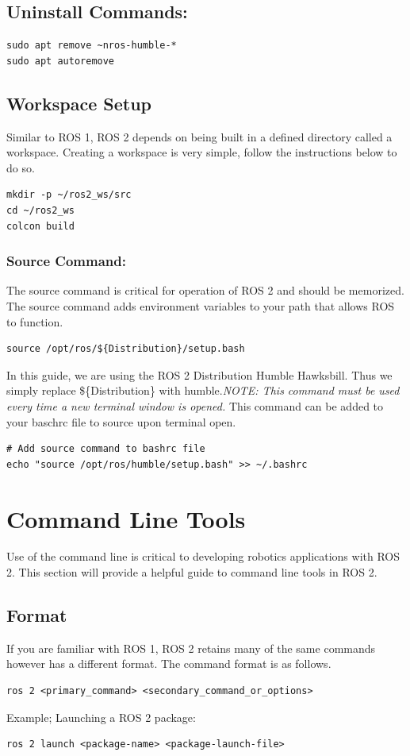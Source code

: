 \documentclass[11pt]{article}
\begin{document}
\subsection{Uninstall Commands: }
\begin{lstlisting}
sudo apt remove ~nros-humble-*
sudo apt autoremove
\end{lstlisting}
\subsection{Workspace Setup}
Similar to ROS 1, ROS 2 depends on being built in a defined directory called a workspace. Creating a workspace is very simple, follow the instructions below to do so.\\
\begin{lstlisting}
mkdir -p ~/ros2_ws/src
cd ~/ros2_ws 
colcon build
\end{lstlisting}

\subsubsection{Source Command: }
The source command is critical for operation of ROS 2 and should be memorized. The source command adds environment variables to your path that allows ROS to function. 

\begin{lstlisting}
source /opt/ros/${Distribution}/setup.bash
\end{lstlisting}
\noindent
In this guide, we are using the ROS 2 Distribution Humble Hawksbill. Thus we simply replace \$\{Distribution\} with humble.\textit{NOTE: This command must be used every time a new terminal window is opened.} This command can be added to your baschrc file to source upon terminal open.\\
\begin{lstlisting}
# Add source command to bashrc file
echo "source /opt/ros/humble/setup.bash" >> ~/.bashrc
\end{lstlisting}




\section{Command Line Tools}
Use of the command line is critical to developing robotics applications with ROS 2. This section will provide a helpful guide to command line tools in ROS 2.
\subsection{Format}
If you are familiar with ROS 1, ROS 2 retains many of the same commands however has a different format. The command format is as follows. \\
\begin{lstlisting}
ros 2 <primary_command> <secondary_command_or_options>
\end{lstlisting}
Example; Launching a ROS 2 package:\\
\begin{lstlisting}
ros 2 launch <package-name> <package-launch-file>
\end{lstlisting}
\end{document}
